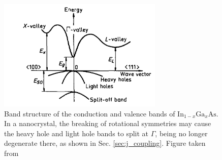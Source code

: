 \begin{figure}
\begin{center}
\includegraphics[width=0.7\textwidth]{figures/ingaas_band_structure}
\caption{Band structure of the conduction and valence bands of $\text{In}_{1-x}\text{Ga}_x\text{As}$. In a nanocrystal, the breaking of rotational symmetries may cause the heavy hole and light hole bands to split at $\Gamma$, being no longer degenerate there, as shown in Sec. \ref{sec:j_coupling}. Figure taken from \cite[Fig. 3.2.1]{semiconductor_handbook} \label{fig:ingaas_band_structure}}
\end{center}
\end{figure}

